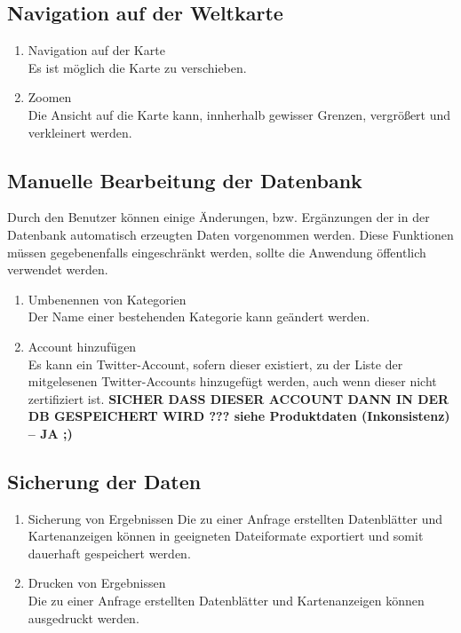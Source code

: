 \subsection{Navigation auf der Weltkarte}
\begin{enumerate}[ align=left, label={\textbf{\textbackslash F30\arabic*0\textbackslash}} ]
	\item Navigation auf der Karte \label{PF:Navigation} \\
	Es ist möglich die Karte zu verschieben.
	\item Zoomen \label{PF:Zoomen} \\
	Die Ansicht auf die Karte kann, innherhalb gewisser Grenzen, vergrößert und verkleinert werden.
\end{enumerate}	
\subsection{Manuelle Bearbeitung der Datenbank}
Durch den Benutzer können einige Änderungen, bzw. Ergänzungen der in der Datenbank automatisch erzeugten Daten vorgenommen werden. Diese Funktionen müssen gegebenenfalls eingeschränkt werden, sollte die Anwendung öffentlich verwendet werden.
\begin{enumerate}[ align=left, label={\textbf{\textbackslash F40\arabic*0\textbackslash}}]
	\item Umbenennen von Kategorien \label{PF:KategorieUm} \\
	Der Name einer bestehenden Kategorie kann geändert werden.
	\item Account hinzufügen \label{PF:AccountHinzu} \\
	Es kann ein Twitter-Account, sofern dieser existiert, zu der Liste der mitgelesenen Twitter-Accounts hinzugefügt werden, auch wenn dieser nicht zertifiziert ist.
	\textbf{SICHER DASS DIESER ACCOUNT DANN IN DER DB GESPEICHERT WIRD ??? siehe Produktdaten (Inkonsistenz) -- JA ;)}
\end{enumerate}
\subsection{Sicherung der Daten}
\begin{enumerate}[ align=left, label={\textbf{\textbackslash F50\arabic*0\textbackslash}}]
	\item Sicherung von Ergebnissen \label{PF:Sicherung}
	Die zu einer Anfrage erstellten Datenblätter und Kartenanzeigen können in geeigneten Dateiformate exportiert und somit dauerhaft gespeichert werden.
	\item Drucken von Ergebnissen \label{PF:Drucken} \\
	Die zu einer Anfrage erstellten Datenblätter und Kartenanzeigen können ausgedruckt werden. 
\end{enumerate}
